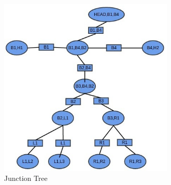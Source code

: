 \begin{figure}[ht]
    \centering
    \includegraphics[width=0.75\textwidth]{figures/ml5JT.jpg}
    \caption{Junction Tree}
\end{figure}
